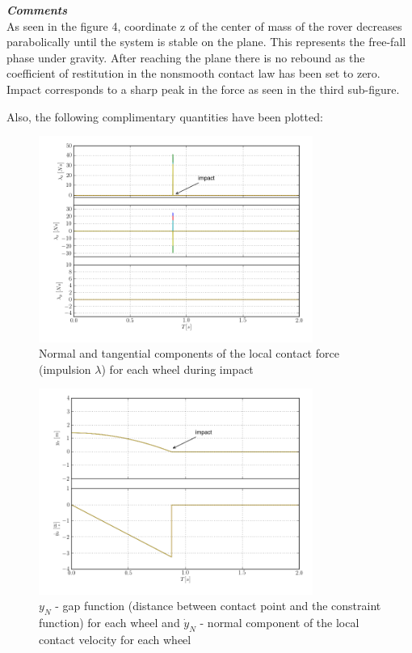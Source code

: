 \noindent \textbf{\textit{\Large{Comments}}}\\[1mm]
\noindent As seen in the figure 4, coordinate z of the center of mass of the rover decreases parabolically until the system is stable on the plane. This represents the
free-fall phase under gravity. After reaching the plane there is no rebound as the coefficient of restitution in the nonsmooth contact law has been set to zero. Impact corresponds to a 
sharp peak in the force as seen in the third sub-figure.

\noindent Also, the following complimentary quantities have been plotted:

\begin{figure}[H]
  \centering
    \includegraphics[width=0.8\textwidth]{lambdaNTS}
  \caption{Normal and tangential components of the local contact force (impulsion $\lambda$) for each wheel during impact}
\end{figure}

\begin{figure}[H]
  \centering
    \includegraphics[width=0.8\textwidth]{yNyNdot}
  \caption{$y_{N}$ - gap function (distance between contact point and the constraint function) for each wheel and $\dot{y}_{N}$ - normal component of the local contact velocity for each wheel}
\end{figure}

